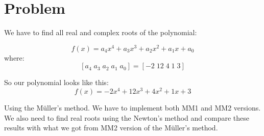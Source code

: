 \section{Problem}

We have to find all real and complex roots of the polynomial:

\[ f(x) = a_4x^4+a_3x^3+a_2x^2+a_1x+a_0 \]
where:
\[ [a_4 \; a_3 \; a_2 \; a_1 \; a_0] = [-2 \; 12 \; 4 \; 1 \; 3] \]

So our polynomial looks like this:
\[ f(x) = -2x^4+12x^3+4x^2+1x+3 \]

Using the M{\"u}ller's method. We have to implement both MM1 and MM2 versions. We also need to find real roots using the Newton's method and compare these results with what we got from MM2 version of the M{\"u}ller's method.

